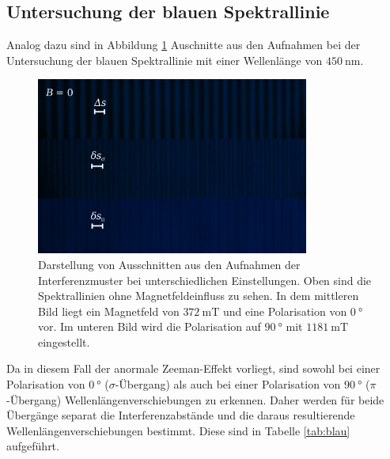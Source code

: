  \subsection{Untersuchung der blauen Spektrallinie}
 Analog dazu sind in Abbildung \ref{fig:blau} Auschnitte aus den Aufnahmen bei der Untersuchung der blauen
 Spektrallinie mit einer Wellenlänge von $\SI{450}{\nano\meter}$.
 \begin{figure}[H]
     \centering
     \includegraphics[width=0.8\textwidth]{images/zebraplot_blau.jpg}
     \caption{Darstellung von Ausschnitten aus den Aufnahmen der Interferenzmuster bei unterschiedlichen
     Einstellungen. Oben sind die Spektrallinien ohne Magnetfeldeinfluss zu sehen. In dem mittleren Bild 
     liegt ein Magnetfeld von $\SI{372}{\milli\tesla}$ und eine Polarisation von $\SI{0}{\degree}$ vor. Im 
     unteren Bild wird die Polarisation auf $\SI{90}{\degree}$ mit $\SI{1181}{\milli\tesla}$ eingestellt.}
     \label{fig:blau}
 \end{figure} \noindent
 Da in diesem Fall der anormale Zeeman-Effekt vorliegt, sind sowohl bei einer Polarisation von
 $\SI{0}{\degree}$ ($\sigma$-Übergang) als auch bei einer Polarisation von $\SI{90}{\degree}$ ($\pi$-Übergang)
 Wellenlängenverschiebungen zu erkennen. Daher werden für beide Übergänge separat die Interferenzabstände
 und die daraus resultierende Wellenlängenverschiebungen bestimmt. Diese sind in Tabelle \ref{tab:blau}
 aufgeführt.
